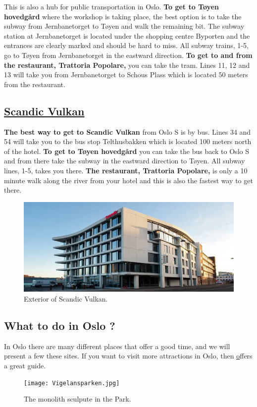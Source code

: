 \documentclass{article}
\begin{document}
This is also
a hub for public transportation in Oslo. \textbf{To get to
Tøyen hovedgård} where the workshop is taking place,
the best option is to take the subway from Jernbanetorget
to Tøyen and walk the remaining bit. The subway station
at Jernbanetorget is located under the shopping centre
Byporten and the entrances are clearly marked and should
be hard to miss. All subway trains, 1-5, go to Tøyen from
Jernbanetorget in the eastward direction. \textbf{To get to and from
the restaurant, Trattoria Popolare,} you can take the tram. Lines
11, 12 and 13 will take you from Jernbanetorget to Schous Plass
which is located 50 meters from the restaurant.



\subsection*{\underline{Scandic Vulkan}}

\textbf{The best way to get to Scandic Vulkan} from
Oslo S is by bus. Lines 34 and 54 will take you
to the bus stop Telthusbakken which is located 100 meters
north of the hotel. \textbf{To get to Tøyen hovedgård}
you can take the bus back to Oslo S and from there take
the subway in the eastward direction to Tøyen. All subway
lines, 1-5, takes you there. \textbf{The restaurant, Trattoria Popolare,}
is only a 10 minute walk along the river
 from your hotel and this is also
the fastest way to get there.

\begin{figure}
\centering
\includegraphics[scale=0.3]{img/scandic-vulkan.jpg}
\caption{\label{fig:frog1}Exterior of Scandic Vulkan.}
\end{figure}



\clearpage
\begin{center}


\section*{What to do in Oslo ?}
In Oslo there are many different places that offer a good time, and we will present a few these sites. If you want to visit more attractions in Oslo, then \href{www.visitoslo.com} offers a great guide.


\end{center}
\begin{figure}
    \centering
    \captionsetup{width=0.4\textwidth}
    \texttt{[image: Vigelansparken.jpg]}%
     \caption*{The monolith sculpute in the Park.}
\end{figure}
\end{document}

